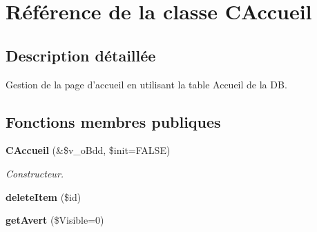 \section{Référence de la classe CAccueil}
\label{class_c_accueil}


\subsection{Description détaillée}
Gestion de la page d'accueil en utilisant la table Accueil de la DB. \subsection*{Fonctions membres publiques}
\begin{CompactItemize}
\item 
{\bf CAccueil} (\&\$v\_\-oBdd, \$init=FALSE)
\begin{CompactList}\small\item\em Constructeur. \item\end{CompactList}\item 
\textbf{deleteItem} (\$id)\label{class_c_accueil_12829ba18906523fa4154aebde4ad281}

\item 
{\bf getAvert} (\$Visible=0)\label{class_c_accueil_5d95d988edee93d2b3b4fb2fe3738810}


\end{CompactItemize}
